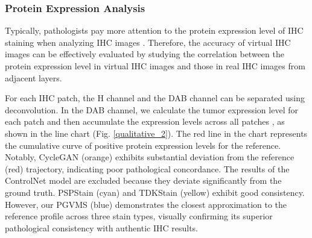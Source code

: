 \documentclass[journal,twoside,web]{ieeecolor}
\begin{document}
\subsubsection{Protein Expression Analysis}
Typically, pathologists pay more attention to the protein expression level of IHC staining when analyzing IHC images \cite{li2025biomedical}. Therefore, the accuracy of virtual IHC images can be effectively evaluated by studying the correlation between the protein expression level in virtual IHC images and those in real IHC images from adjacent layers.

For each IHC patch, the H channel and the DAB channel can be separated using deconvolution. In the DAB channel, we calculate the tumor expression level for each patch and then accumulate the expression levels across all patches \cite{chen2024pathological}, as shown in the line chart (Fig. \ref{qualitative_2}). The red line in the chart represents the cumulative curve of positive protein expression levels for the reference. Notably, CycleGAN (orange) exhibits substantial deviation from the reference (red) trajectory, indicating poor pathological concordance. {The results of the ControlNet model are excluded because they deviate significantly from the ground truth.} PSPStain (cyan) and TDKStain (yellow) exhibit good consistency. However, our PGVMS (blue) demonstrates the closest approximation to the reference profile across three stain types, visually confirming its superior pathological consistency with authentic IHC results.
\end{document}
